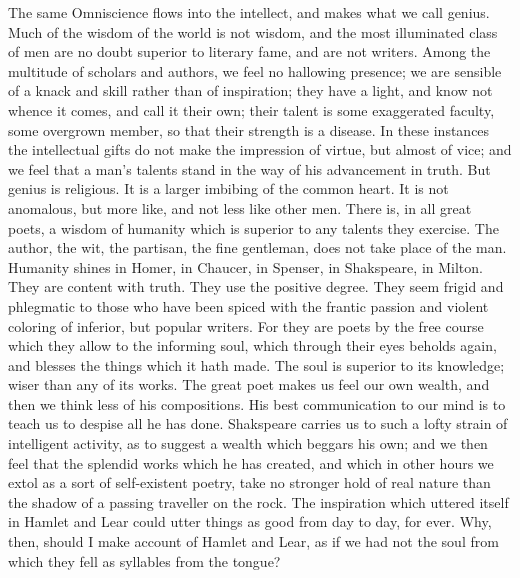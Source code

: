 \documentclass{article}
\begin{document}
The same Omniscience flows into the intellect, and makes what we call genius. Much of the wisdom of the world is not wisdom, and the most illuminated class of men are no doubt superior to literary fame, and are not writers. Among the multitude of scholars and authors, we feel no hallowing presence; we are sensible of a knack and skill rather than of inspiration; they have a light, and know not whence it comes, and call it their own; their talent is some exaggerated faculty, some overgrown member, so that their strength is a disease. In these instances the intellectual gifts do not make the impression of virtue, but almost of vice; and we feel that a man's talents stand in the way of his advancement in truth. But genius is religious. It is a larger imbibing of the common heart. It is not anomalous, but more like, and not less like other men. There is, in all great poets, a wisdom of humanity which is superior to any talents they exercise. The author, the wit, the partisan, the fine gentleman, does not take place of the man. Humanity shines in Homer, in Chaucer, in Spenser, in Shakspeare, in Milton. They are content with truth. They use the positive degree. They seem frigid and phlegmatic to those who have been spiced with the frantic passion and violent coloring of inferior, but popular writers. For they are poets by the free course which they allow to the informing soul, which through their eyes beholds again, and blesses the things which it hath made. The soul is superior to its knowledge; wiser than any of its works. The great poet makes us feel our own wealth, and then we think less of his compositions. His best communication to our mind is to teach us to despise all he has done. Shakspeare carries us to such a lofty strain of intelligent activity, as to suggest a wealth which beggars his own; and we then feel that the splendid works which he has created, and which in other hours we extol as a sort of self-existent poetry, take no stronger hold of real nature than the shadow of a passing traveller on the rock. The inspiration which uttered itself in Hamlet and Lear could utter things as good from day to day, for ever. Why, then, should I make account of Hamlet and Lear, as if we had not the soul from which they fell as syllables from the tongue?
\end{document}
